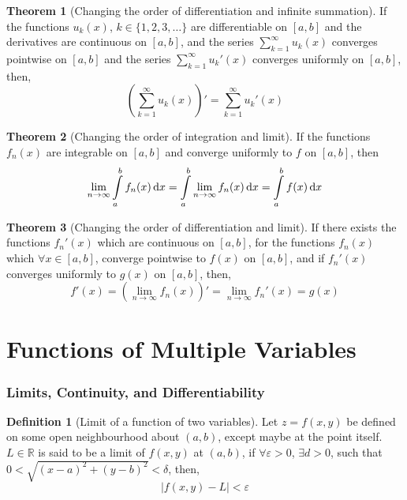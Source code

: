 \documentclass[fleqn, a4paper, 12pt, twoside]{article}
\theoremstyle{definition}
\newtheorem{definition}{Definition}
\theoremstyle{theorem}
\newtheorem{theorem}{Theorem}
\begin{document}
{\begin{theorem}[Changing the order of differentiation and infinite summation]
	If the functions $u_k(x)$, $k \in \{1, 2, 3, \dots\}$ are differentiable on $[a,b]$ and the derivatives are continuous on $[a,b]$, and the series $\sum\limits_{k = 1}^{\infty} u_k(x)$ converges pointwise on $[a,b]$ and the series $\sum\limits_{k = 1}^{\infty} {u_k}'(x)$ converges uniformly on $[a,b]$, then,
	\begin{equation*}
		\left( \sum\limits_{k = 1}^{\infty} u_k(x) \right)' = \sum\limits_{k = 1}^{\infty} {u_k}'(x)
	\end{equation*}
\end{theorem}

\begin{theorem}[Changing the order of integration and limit]
	If the functions $f_n(x)$ are integrable on $[a,b]$ and converge uniformly to $f$ on $[a,b]$, then
	\begin{equation*}
		\lim\limits_{n \to \infty} \int\limits_{a}^{b} f_n(x) \dif x = \int\limits_{a}^{b} \lim\limits_{n \to \infty} f_n(x) \dif x = \int\limits_{a}^{b} f(x) \dif x
	\end{equation*}
\end{theorem}

\begin{theorem}[Changing the order of differentiation and limit]
	If there exists the functions ${f_n}'(x)$ which are continuous on $[a,b]$, for the functions $f_n(x)$ which $\forall x \in [a,b]$, converge pointwise to $f(x)$ on $[a,b]$, and if ${f_n}'(x)$ converges uniformly to $g(x)$ on $[a,b]$, then,
	\begin{equation*}
		f'(x) = \left( \lim\limits_{n \to \infty} f_n(x) \right)' = \lim\limits_{n \to \infty} {f_n}'(x) = g(x) 
	\end{equation*}
\end{theorem}

\newpage
\part{Functions of Multiple Variables}

\section{Limits, Continuity, and Differentiability}

\begin{definition}[Limit of a function of two variables]
	Let $z = f(x,y)$ be defined on some open neighbourhood about $(a,b)$, except maybe at the point itself.
	$L \in \mathbb{R}$ is said to be a limit of $f(x,y)$ at $(a,b)$, if $\forall \varepsilon > 0$, $\exists d > 0$, such that $0 < \sqrt{(x - a)^2 + (y - b)^2} < \delta$, then,
	\begin{equation*}
		|f(x,y) - L| < \varepsilon
	\end{equation*}
\end{definition}

}
\end{document}
